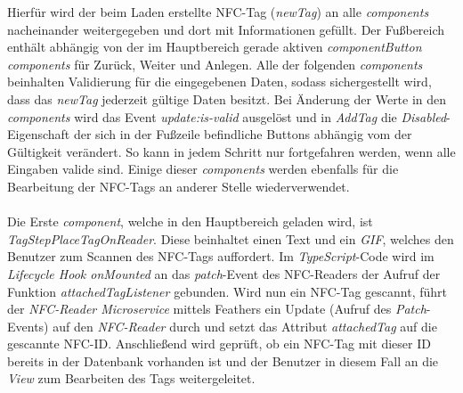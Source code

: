 \documentclass[10pt, a4paper]{article}
\begin{document}
\begin{onehalfspace}
Hierfür wird der beim Laden erstellte NFC-Tag (\textit{newTag}) an alle \textit{components} nacheinander weitergegeben und dort mit Informationen gefüllt.
Der Fußbereich enthält abhängig von der im Hauptbereich gerade aktiven \textit{component}\textit{Button components} für \glqq Zurück\grqq{}, \glqq Weiter\grqq{} und
\glqq Anlegen\grqq.
Alle der folgenden \textit{components} beinhalten Validierung für die eingegebenen Daten, sodass sichergestellt wird, dass das \textit{newTag} jederzeit gültige Daten besitzt.
Bei Änderung der Werte in den \textit{components} wird das Event \textit{update:is-valid} ausgelöst und in \textit{AddTag} die \textit{Disabled}-Eigenschaft der sich in der Fußzeile befindliche Buttons abhängig vom der Gültigkeit verändert.
So kann in jedem Schritt nur fortgefahren werden, wenn alle Eingaben valide sind.
Einige dieser \textit{components} werden ebenfalls für die Bearbeitung der NFC-Tags an anderer Stelle wiederverwendet.
\\~\\
Die Erste \textit{component}, welche in den Hauptbereich geladen wird, ist \textit{TagStepPlaceTagOnReader}.
Diese beinhaltet einen Text und ein \textit{GIF}, welches den Benutzer zum Scannen des NFC-Tags auffordert.
Im \textit{TypeScript}-Code wird im \textit{Lifecycle Hook onMounted} an das \textit{patch}-Event des
NFC-Readers der Aufruf der Funktion \textit{attachedTagListener} gebunden. Wird nun ein NFC-Tag gescannt, führt der \textit{NFC-Reader Microservice} mittels Feathers ein Update (Aufruf des \textit{Patch}-Events) auf den \textit{NFC-Reader} durch und setzt das Attribut \textit{attachedTag} auf die gescannte NFC-ID.
Anschließend wird geprüft, ob ein NFC-Tag mit dieser ID bereits in der Datenbank vorhanden ist und der Benutzer in diesem Fall an die \textit{View} zum Bearbeiten des Tags weitergeleitet.

\end{onehalfspace}
\end{document}
